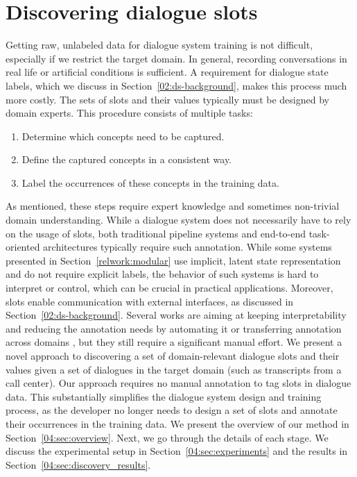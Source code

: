 \chapter{Discovering dialogue slots}%
\label{chap:data_analysis}
Getting raw, unlabeled data for dialogue system training is not difficult, especially if we restrict the target domain.
In general, recording conversations in real life or artificial conditions is sufficient.
A requirement for dialogue state labels, which we discuss in Section~\ref{02:ds-background}, makes this process much more costly.
The sets of slots and their values typically must be designed by domain experts.
This procedure consists of multiple tasks:
\begin{enumerate}
    \item Determine which concepts need to be captured.
    \item Define the captured concepts in a consistent way.
    \item Label the occurrences of these concepts in the training data.
\end{enumerate}
As mentioned, these steps require expert knowledge and sometimes non-trivial domain understanding.
While a dialogue system does not necessarily have to rely on the usage of slots, both traditional pipeline systems \cite{young_pomdp-based_2013} and end-to-end task-oriented architectures \cite{wen2016network} typically require such annotation.
While some systems presented in Section~\ref{relwork:modular} use implicit, latent state representation and do not require explicit labels, the behavior of such systems is hard to interpret or control, which can be crucial in practical applications.
Moreover, slots enable communication with external interfaces, as discussed in Section~\ref{02:ds-background}.
Several works are aiming at keeping interpretability and reducing the annotation needs by automating it \citep{chen2014leveraging,chen2015jointly} or transferring annotation across domains \cite{zhao_zero-shot_2018,coope_span-convert_2020}, but they still require a significant manual effort.
We present a novel approach to discovering a set of domain-relevant dialogue slots and their values given a set of dialogues in the target domain (such as transcripts from a call center).
Our approach requires no manual annotation to tag slots in dialogue data.
This substantially simplifies the dialogue system design and training process, as the developer no longer needs to design a set of slots and annotate their occurrences in the training data.
We present the overview of our method in Section~\ref{04:sec:overview}.
Next, we go through the details of each stage.
We discuss the experimental setup in Section~\ref{04:sec:experiments} and the results in Section~\ref{04:sec:discovery_results}.

